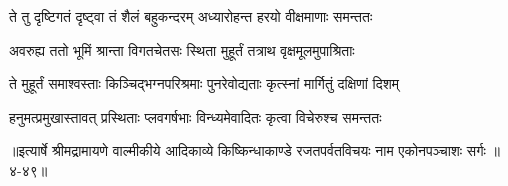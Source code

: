\twolineshloka
{ते तु दृष्टिगतं दृष्ट्वा तं शैलं बहुकन्दरम्}
{अध्यारोहन्त हरयो वीक्षमाणाः समन्ततः} %

\twolineshloka
{अवरुह्य ततो भूमिं श्रान्ता विगतचेतसः}
{स्थिता मुहूर्तं तत्राथ वृक्षमूलमुपाश्रिताः} %

\twolineshloka
{ते मुहूर्तं समाश्वस्ताः किञ्चिद्भग्नपरिश्रमाः}
{पुनरेवोद्यताः कृत्स्नां मार्गितुं दक्षिणां दिशम्} %

\twolineshloka
{हनुमत्प्रमुखास्तावत् प्रस्थिताः प्लवगर्षभाः}
{विन्ध्यमेवादितः कृत्वा विचेरुश्च समन्ततः} %


॥इत्यार्षे श्रीमद्रामायणे वाल्मीकीये आदिकाव्ये किष्किन्धाकाण्डे रजतपर्वतविचयः नाम एकोनपञ्चाशः सर्गः ॥४-४९॥
